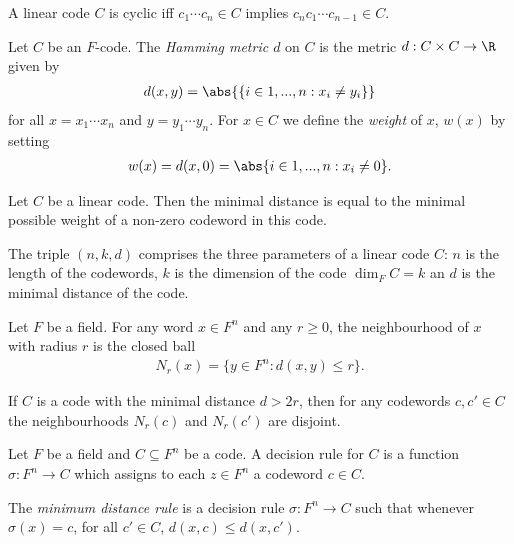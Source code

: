 \documentclass{article}
\begin{document}
\begin{definition}
	A linear code $C$ is cyclic iff $c_1\cdots c_n\in C$ implies $c_nc_1\cdots c_{n-1}\in C$.
\end{definition}

\begin{definition}
	Let $C$ be an $F$-code. The \emph{Hamming metric $d$} on $C$ is the metric
	$d:C\times C\to\R$ given by
	\begin{align*}
		d(x,y) = \abs{\{i\in{1,...,n}:x_i\not=y_i\}}
	\end{align*}
	for all $x=x_1\cdots x_n$ and $y=y_1\cdots y_n$.
	For $x\in C$ we define the \emph{weight} of $x$, $w(x)$ by setting
	\begin{align*}
		w(x)=d(x,0)=\abs\{i\in {1,...,n} : x_i\not=0\}.
	\end{align*}
\end{definition}

\begin{lemma}[Lecture 10]
	Let $C$ be a linear code. Then the minimal distance is equal to the minimal possible weight
	of a non-zero codeword in this code.
\end{lemma}

\begin{definition}[Lecture 10]
	The triple $(n,k,d)$ comprises the three parameters of a linear code $C$: $n$ is the length of the
	codewords, $k$ is the dimension of the code $\dim_F C=k$ an $d$ is the minimal distance of the code.
\end{definition}

\begin{definition}[Lecture 10]
	Let $F$ be a field. For any word $x\in F^n$ and any $r\geq 0$, the neighbourhood of $x$ with radius
	$r$ is the closed ball
	\begin{align*}
		N_r(x)=\{y\in F^n : d(x,y)\leq r\}.
	\end{align*}
\end{definition}

\begin{lemma}[Lecture 10]
	If $C$ is a code with the minimal distance $d>2r$, then for any codewords $c,c'\in C$ the neighbourhoods
	$N_r(c)$ and $N_r(c')$ are disjoint.
\end{lemma}

\begin{definition}[Lecture 10]
	Let $F$ be a field and $C\subseteq F^n$ be a code. A decision rule for $C$ is a function
	$\sigma:F^n\to C$ which assigns to each $z\in F^n$ a codeword $c\in C$.
\end{definition}

\begin{definition}
	The \emph{minimum distance rule} is a decision rule $\sigma:F^n\to C$ such that
	whenever $\sigma(x)=c$, for all $c'\in C$, $d(x,c) \leq d(x,c')$.
\end{definition}
\end{document}
